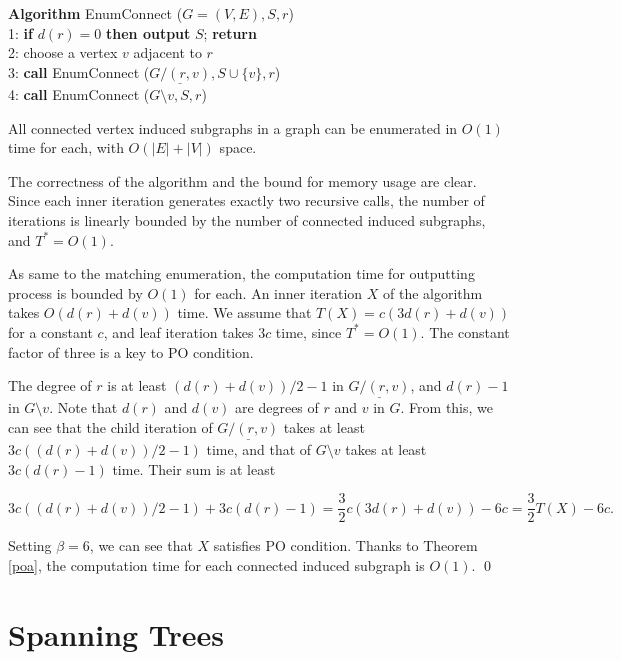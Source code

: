\documentclass{llncs}
\begin{document}
\begin{tabbing}
{\bf Algorithm} EnumConnect ($G=(V,E), S, r$)\\
1: {\bf if} $d(r) = 0$ {\bf then output} $S$; {\bf return}\\
2: choose a vertex $v$ adjacent to $r$\\
3: {\bf call} EnumConnect ($\underline{G/(r,v)}, S\cup \{ v\}, r$)\\
4: {\bf call} EnumConnect ($G\setminus v, S, r$)
\end{tabbing}

\begin{theorem}\label{connect}
All connected vertex induced subgraphs in a graph can be enumerated in $O(1)$
 time for each, with $O(|E|+|V|)$ space.
\end{theorem}

\proof
The correctness of the algorithm and the bound for memory usage are clear.
Since each inner iteration generates exactly two recursive calls, 
 the number of iterations is linearly bounded by the number of connected
 induced subgraphs, and $T^* = O(1)$.

As same to the matching enumeration, the computation time for outputting 
process is bounded by $O(1)$ for each.
An inner iteration $X$ of the algorithm takes $O(d(r)+d(v))$ time.
We assume that $T(X) = c(3d(r)+d(v))$ for a constant $c$, and 
 leaf iteration takes $3c$ time, since $T^* = O(1)$.
The constant factor of three is a key to PO condition.

The degree of $r$ is at least $(d(r)+d(v))/2-1$ in $\underline{G/(r,v)}$, and 
 $d(r)-1$ in $G\setminus v$.
Note that $d(r)$ and $d(v)$ are degrees of $r$ and $v$ in $G$.
From this, we can see that the child iteration of $\underline{G/(r,v)}$ takes
 at least $3c((d(r)+d(v))/2-1)$ time, and that of $G\setminus v$ takes
 at least $3c(d(r)-1)$ time.
Their sum is at least

\vspace{-1mm}
\[ 3c((d(r)+d(v))/2-1) + 3c(d(r)-1) =
 \frac{3}{2}c(3d(r)+d(v)) - 6c = \frac{3}{2}T(X) - 6c.\]
\vspace{-3mm}

\noindent
Setting $\beta = 6$, we can see that $X$ satisfies PO condition.
Thanks to Theorem \ref{poa}, the computation time for each connected
 induced subgraph is $O(1)$.
\qed


\vspace{-2mm}
\section{Spanning Trees}\label{sec:sptree}
\vspace{-2mm}
\end{document}
